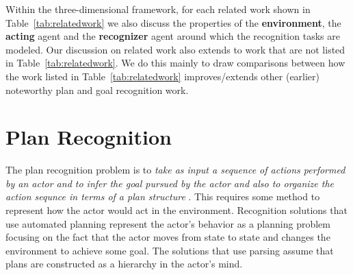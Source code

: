 \noindent Within the three-dimensional framework, for each related work shown in Table~\ref{tab:relatedwork} we also discuss the properties of the \textbf{environment}, the \textbf{acting} agent and the \textbf{recognizer} agent around which the recognition tasks are modeled. Our discussion on related work also extends to work that are not listed in Table~\ref{tab:relatedwork}. We do this mainly to draw comparisons between how the work listed in Table~\ref{tab:relatedwork} improves/extends other (earlier) noteworthy plan and goal recognition work.

\begin{table}[tpb]
\caption{Fitting related work to the analysis framework}
\label{tab:relatedwork}
%
\end{table}

\section{Plan Recognition}
The plan recognition problem is to \textit{take as input a sequence of actions performed by an actor and to infer the  goal pursued by the actor and also to organize the action sequnce in terms of a plan structure} \cite{schmidt1978plan}. This requires some method to represent how the actor would act in the environment. Recognition solutions that use automated planning represent the actor's behavior as a planning problem focusing on the fact that the actor moves from state to state and changes the environment to achieve some goal. The solutions that use parsing assume that plans are constructed as a hierarchy in the actor's mind.

